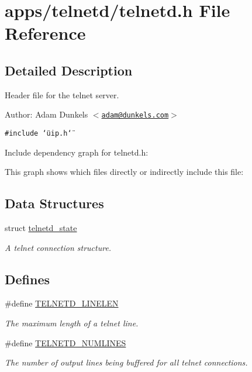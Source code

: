 \hypertarget{a00047}{
\section{apps/telnetd/telnetd.h File Reference}
\label{a00047}
}


\subsection{Detailed Description}
Header file for the telnet server. 

\begin{Desc}
\item[Author:]Adam Dunkels $<$\href{mailto:adam@dunkels.com}{\tt adam@dunkels.com}$>$ \end{Desc}


{\tt \#include \char`\"{}uip.h\char`\"{}}\par


Include dependency graph for telnetd.h:

This graph shows which files directly or indirectly include this file:\subsection*{Data Structures}
\begin{CompactItemize}
\item 
struct \hyperlink{a00027}{telnetd\_\-state}
\begin{CompactList}\small\item\em A telnet connection structure. \item\end{CompactList}\end{CompactItemize}
\subsection*{Defines}
\begin{CompactItemize}
\item 
\hypertarget{a00081_g7764fc5e71ca9e338a6a66da54d3b308}{
\#define \hyperlink{a00081_g7764fc5e71ca9e338a6a66da54d3b308}{TELNETD\_\-LINELEN}}
\label{a00081_g7764fc5e71ca9e338a6a66da54d3b308}

\begin{CompactList}\small\item\em The maximum length of a telnet line. \item\end{CompactList}\item 
\hypertarget{a00081_gd20b6d3f9a5b992bc2de6429b37169ca}{
\#define \hyperlink{a00081_gd20b6d3f9a5b992bc2de6429b37169ca}{TELNETD\_\-NUMLINES}}
\label{a00081_gd20b6d3f9a5b992bc2de6429b37169ca}

\begin{CompactList}\small\item\em The number of output lines being buffered for all telnet connections. \item\end{CompactList}\end{CompactItemize}
